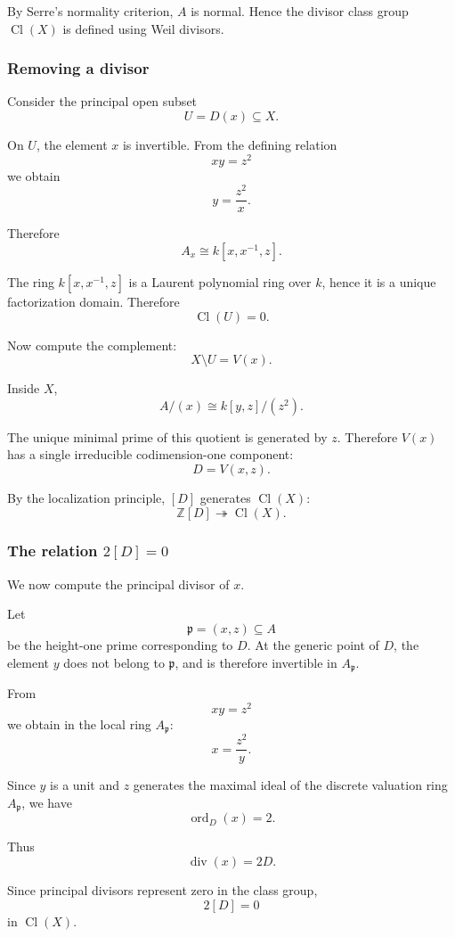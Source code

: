 By Serre's normality criterion, \(A\) is normal. Hence the divisor class group \(\operatorname{Cl}(X)\) is defined using Weil divisors.

\subsubsection{Removing a divisor}

Consider the principal open subset
\[
U=D(x)\subseteq X.
\]

On \(U\), the element \(x\) is invertible. From the defining relation
\[
xy=z^2
\]
we obtain
\[
y=\frac{z^2}{x}.
\]

Therefore
\[
A_x
\cong
k[x,x^{-1},z].
\]

The ring \(k[x,x^{-1},z]\) is a Laurent polynomial ring over \(k\), hence it is a unique factorization domain. Therefore
\[
\operatorname{Cl}(U)=0.
\]

Now compute the complement:
\[
X\setminus U=V(x).
\]

Inside \(X\),
\[
A/(x)
\cong
k[y,z]/(z^2).
\]

The unique minimal prime of this quotient is generated by \(z\). Therefore \(V(x)\) has a single irreducible codimension-one component:
\[
D=V(x,z).
\]

By the localization principle, \([D]\) generates \(\operatorname{Cl}(X)\):
\[
\mathbb{Z}[D]\twoheadrightarrow \operatorname{Cl}(X).
\]

\subsubsection{The relation \(2[D]=0\)}

We now compute the principal divisor of \(x\).

Let
\[
\mathfrak p=(x,z)\subseteq A
\]
be the height-one prime corresponding to \(D\). At the generic point of \(D\), the element \(y\) does not belong to \(\mathfrak p\), and is therefore invertible in \(A_{\mathfrak p}\).

From
\[
xy=z^2
\]
we obtain in the local ring \(A_{\mathfrak p}\):
\[
x=\frac{z^2}{y}.
\]

Since \(y\) is a unit and \(z\) generates the maximal ideal of the discrete valuation ring \(A_{\mathfrak p}\), we have
\[
\operatorname{ord}_D(x)=2.
\]

Thus
\[
\operatorname{div}(x)=2D.
\]

Since principal divisors represent zero in the class group,
\[
2[D]=0
\]
in \(\operatorname{Cl}(X)\).

